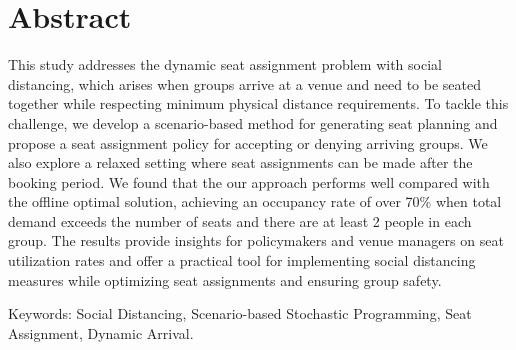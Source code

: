 
\section*{Abstract}

This study addresses the dynamic seat assignment problem with social distancing, which arises when groups arrive at a venue and need to be seated together while respecting minimum physical distance requirements. To tackle this challenge, we develop a scenario-based method for generating seat planning and propose a seat assignment policy for accepting or denying arriving groups. We also explore a relaxed setting where seat assignments can be made after the booking period. We found that the our approach performs well compared with the offline optimal solution, achieving an occupancy rate of over 70\% when total demand exceeds the number of seats and there are at least 2 people in each group. The results provide insights for policymakers and venue managers on seat utilization rates and offer a practical tool for implementing social distancing measures while optimizing seat assignments and ensuring group safety.


Keywords: Social Distancing, Scenario-based Stochastic Programming, Seat Assignment, Dynamic Arrival.

